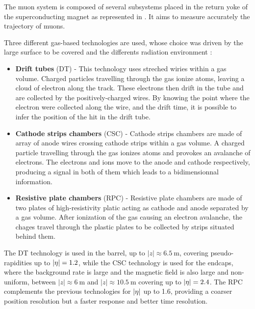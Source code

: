         The muon system is composed of several subsystems placed in the return yoke of
        the superconducting magnet as represented in . It aims to
        measure accurately the trajectory of muons.


        Three different gas-based technologies are used, whose choice was driven by the
        large surface to be covered and the differents radiation environment :
        \begin{itemize}
            \item \textbf{Drift tubes} (DT) - This technology uses streched wiries within
                a gas volume. Charged particles travelling through the gas ionize atoms,
                leaving a cloud of electron along the track. These electrons then drift
                in the tube and are collected by the positively-charged wires. By knowing
                the point where the electron were collected along the wire, and the
                drift time, it is possible to infer the position of the hit in the drift tube.
            \item \textbf{Cathode strips chambers} (CSC) - Cathode strips chambers are
                made of array of anode wires crossing cathode strips within a gas volume.
                A charged particle travelling through the gas ionizes atoms and provokes an
                avalanche of electrons. The electrons and ions move to the anode and
                cathode respectively, producing a signal in both of them which leads to
                a bidimensionnal information.
            \item \textbf{Resistive plate chambers} (RPC) - Resistive plate chambers are
                made of two plates of high-resistivity platic acting as cathode and anode
                separated by a gas volume. After ionization of the gas causing an
                electron avalanche, the chages travel through the plastic plates to be
                collected by strips situated behind them.
        \end{itemize}

        The DT technology is used in the barrel, up to $\left|z\right| \approx 6.5~\text{m}$, covering
        pseudo-rapidities up to $\left| \eta \right| = 1.2$, while the CSC technology is used for the endcaps,
        where the background rate is large and the magnetic field is also large and non-uniform,
        between $\left|z\right| \approx 6~\text{m}$ and $\left|z\right| \approx 10.5~\text{m}$
        covering up to $\left| \eta \right| = 2.4$. The RPC complements the previous technologies for
        $\left| \eta \right|$ up to 1.6, providing a coarser position resolution but a faster response
        and better time resolution.

